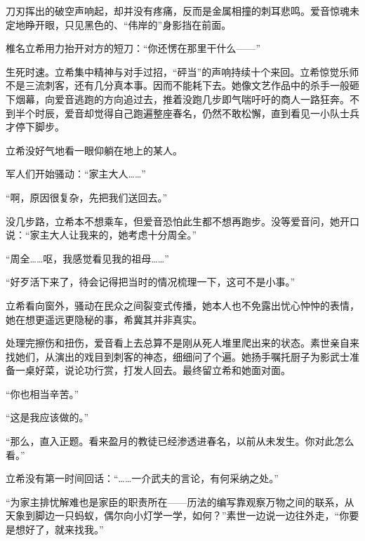 \documentclass{article}
\begin{document}
刀刃挥出的破空声响起，却并没有疼痛，反而是金属相撞的刺耳悲鸣。爱音惊魂未定地睁开眼，只见黑色的、“伟岸的”身影挡在前面。



椎名立希用力抬开对方的短刀：“你还愣在那里干什么——”



生死时速。立希集中精神与对手过招，“砰当”的声响持续十个来回。立希惊觉乐师不是三流刺客，还有几分真本事。因而不能耗下去。她像文艺作品中的杀手一般砸下烟幕，向爱音逃跑的方向追过去，推着没跑几步即气喘吁吁的商人一路狂奔。不到半个时辰，爱音却觉得自己跑遍整座春名，仍然不敢松懈，直到看见一小队士兵才停下脚步。



立希没好气地看一眼仰躺在地上的某人。



军人们开始骚动：“家主大人……”



“啊，原因很复杂，先把我们送回去。”



没几步路，立希本不想乘车，但爱音恐怕此生都不想再跑步。没等爱音问，她开口说：“家主大人让我来的，她考虑十分周全。”



“周全……呕，我感觉看见我的祖母……”



“好歹活下来了，待会记得把当时的情况梳理一下，这可不是小事。”



立希看向窗外，骚动在民众之间裂变式传播，她本人也不免露出忧心忡忡的表情，她在想更遥远更隐秘的事，希冀其并非真实。



处理完擦伤和扭伤，爱音看上去总算不是刚从死人堆里爬出来的状态。素世亲自来找她们，从演出的戏目到刺客的神态，细细问了个遍。她扬手嘱托厨子为影武士准备一桌好菜，说论功行赏，打发人回去。最终留立希和她面对面。



“你也相当辛苦。”



“这是我应该做的。”



“那么，直入正题。看来盈月的教徒已经渗透进春名，以前从未发生。你对此怎么看。”



立希没有第一时间回话：“……一介武夫的言论，有何采纳之处。”



“为家主排忧解难也是家臣的职责所在——历法的编写靠观察万物之间的联系，从天象到脚边一只蚂蚁，偶尔向小灯学一学，如何？”素世一边说一边往外走，“你要是想好了，就来找我。”
\end{document}
